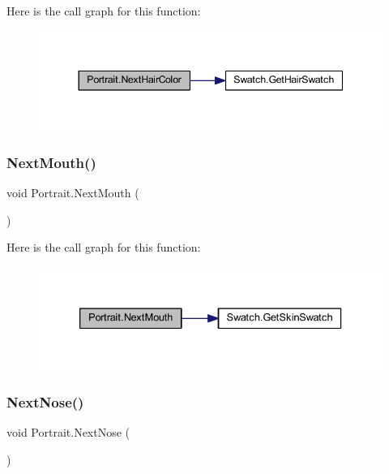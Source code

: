 Here is the call graph for this function\+:
\nopagebreak
\begin{figure}[H]
\begin{center}
\leavevmode
\includegraphics[width=344pt]{class_portrait_a8117eeefced674e0a4a483745ea0053d_cgraph}
\end{center}
\end{figure}
\mbox{\label{class_portrait_ae5ff256c7c14879853d221dfd9df2d63}} 
\subsubsection{\texorpdfstring{NextMouth()}{NextMouth()}}
{\footnotesize\ttfamily void Portrait.\+Next\+Mouth (\begin{DoxyParamCaption}{ }\end{DoxyParamCaption})}

Here is the call graph for this function\+:
\nopagebreak
\begin{figure}[H]
\begin{center}
\leavevmode
\includegraphics[width=333pt]{class_portrait_ae5ff256c7c14879853d221dfd9df2d63_cgraph}
\end{center}
\end{figure}
\mbox{\label{class_portrait_a7fc2c7d9f078303182503c717c05b9d5}} 
\subsubsection{\texorpdfstring{NextNose()}{NextNose()}}
{\footnotesize\ttfamily void Portrait.\+Next\+Nose (\begin{DoxyParamCaption}{ }\end{DoxyParamCaption})}

